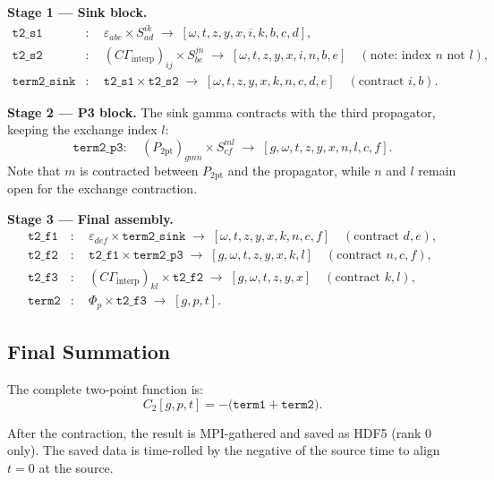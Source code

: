 \documentclass[11pt,a4paper]{article}
\newcommand{\eps}{\varepsilon}
\newcommand{\Gammaint}{\Gamma_{\text{interp}}}
\newcommand{\Cmat}{C}
\begin{document}
\medskip\noindent
\textbf{Stage 1 --- Sink block.}
\begin{align}
  \texttt{t2\_s1} &: \quad \eps_{abc} \times S^{ik}_{ad}
    \;\to\; [\omega,t,z,y,x,i,k,b,c,d], \\
  \texttt{t2\_s2} &: \quad (\Cmat\Gammaint)_{ij} \times S^{jn}_{be}
    \;\to\; [\omega,t,z,y,x,i,n,b,e] \quad (\text{note: index } n \text{ not } l), \\
  \texttt{term2\_sink} &: \quad
    \texttt{t2\_s1} \times \texttt{t2\_s2}
    \;\to\; [\omega,t,z,y,x,k,n,c,d,e] \quad (\text{contract } i,b).
\end{align}

\medskip\noindent
\textbf{Stage 2 --- P3 block.}
The sink gamma contracts with the third propagator, keeping the exchange index $l$:
\begin{equation}
  \texttt{term2\_p3}: \quad
    (P_{2\mathrm{pt}})_{gmn} \times S^{ml}_{cf}
    \;\to\; [g,\omega,t,z,y,x,n,l,c,f].
\end{equation}
Note that $m$ is contracted between $P_{2\mathrm{pt}}$ and the propagator, while $n$
and $l$ remain open for the exchange contraction.

\medskip\noindent
\textbf{Stage 3 --- Final assembly.}
\begin{align}
  \texttt{t2\_f1} &: \quad
    \eps_{def} \times \texttt{term2\_sink}
    \;\to\; [\omega,t,z,y,x,k,n,c,f] \quad (\text{contract } d,e), \\
  \texttt{t2\_f2} &: \quad
    \texttt{t2\_f1} \times \texttt{term2\_p3}
    \;\to\; [g,\omega,t,z,y,x,k,l] \quad (\text{contract } n,c,f), \\
  \texttt{t2\_f3} &: \quad
    (\Cmat\Gammaint)_{kl} \times \texttt{t2\_f2}
    \;\to\; [g,\omega,t,z,y,x] \quad (\text{contract } k,l), \\
  \texttt{term2} &: \quad
    \Phi_p \times \texttt{t2\_f3}
    \;\to\; [g,p,t].
\end{align}

\subsection{Final Summation}

The complete two-point function is:
\begin{equation}
  \boxed{C_2[g, p, t] = -\bigl(\texttt{term1} + \texttt{term2}\bigr).}
\end{equation}

After the contraction, the result is MPI-gathered and saved as HDF5 (rank 0 only).
The saved data is time-rolled by the negative of the source time to align $t=0$
at the source.
\end{document}
